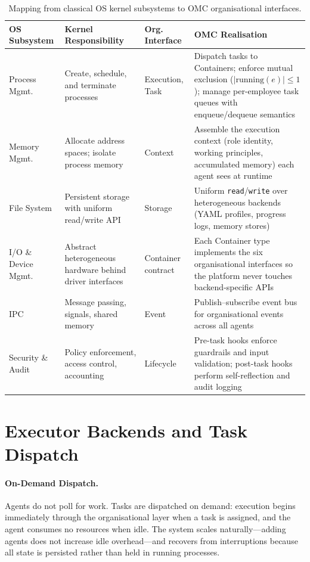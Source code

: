 \begin{table}[H]
\centering
\caption{Mapping from classical OS kernel subsystems to OMC organisational interfaces.}
\label{tab:os-correspondence}
\small
\setlength{\tabcolsep}{4pt}
\begin{tabularx}{\textwidth}{@{}>{\raggedright\arraybackslash}p{}>{\raggedright\arraybackslash}p{}>{\ttfamily\raggedright\arraybackslash}p{}X@{}}
\toprule
\textbf{OS Subsystem} & \textbf{Kernel Responsibility} & \textbf{Org. Interface} & \textbf{OMC Realisation} \\
\midrule
Process Mgmt. & Create, schedule, and terminate processes & Execution, Task & Dispatch tasks to Containers; enforce mutual exclusion ($|\text{running}(e)| \leq 1$); manage per-employee task queues with enqueue/dequeue semantics \\
\addlinespace
Memory Mgmt. & Allocate address spaces; isolate process memory & Context & Assemble the execution context (role identity, working principles, accumulated memory) each agent sees at runtime \\
\addlinespace
File System & Persistent storage with uniform read/write API & Storage & Uniform \texttt{read}/\texttt{write} over heterogeneous backends (YAML profiles, progress logs, memory stores) \\
\addlinespace
I/O \& Device Mgmt. & Abstract heterogeneous hardware behind driver interfaces & Container contract & Each Container type implements the six organisational interfaces so the platform never touches backend-specific APIs \\
\addlinespace
IPC & Message passing, signals, shared memory & Event & Publish--subscribe event bus for organisational events across all agents \\
\addlinespace
Security \& Audit & Policy enforcement, access control, accounting & Lifecycle & Pre-task hooks enforce guardrails and input validation; post-task hooks perform self-reflection and audit logging \\
\bottomrule
\end{tabularx}
\end{table}


\section{Executor Backends and Task Dispatch}
\label{sec:execution}

\paragraph{On-Demand Dispatch.}
Agents do not poll for work. Tasks are dispatched on demand: execution begins immediately through the organisational layer when a task is assigned, and the agent consumes no resources when idle. The system scales naturally---adding agents does not increase idle overhead---and recovers from interruptions because all state is persisted rather than held in running processes.


